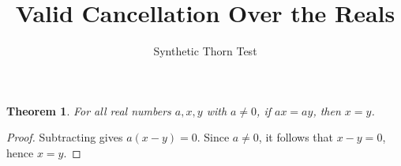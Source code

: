 \documentclass{article}
\newtheorem{theorem}{Theorem}
\begin{document}
\title{Valid Cancellation Over the Reals}
\author{Synthetic Thorn Test}
\maketitle

\begin{theorem}\label{thm:clean-nonzero}
For all real numbers $a,x,y$ with $a\ne 0$, if $ax=ay$, then $x=y$.
\end{theorem}
\begin{proof}
Subtracting gives $a(x-y)=0$. Since $a\ne0$, it follows that $x-y=0$, hence $x=y$.
\end{proof}
\end{document}
